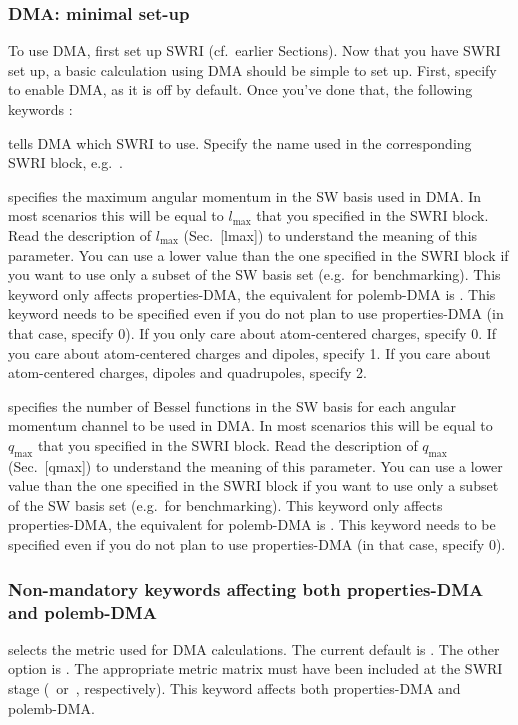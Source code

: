 \documentclass[letterpaper,10pt,english]{sphinxmanual}
\begin{document}
\subsubsection{DMA: minimal set-up}
\label{\detokenize{hfx:dma-minimal-set-up}}
To use DMA, first set up SWRI (cf. earlier Sections). Now that you have
SWRI set up, a basic calculation using DMA should be simple to set up.
First, specify  to enable DMA, as it is off by
default. Once you’ve done that, the following keywords :

 \textendash{} tells DMA which SWRI to use. Specify the name
used in the corresponding SWRI block, e.g. .

 \textendash{} specifies the maximum angular momentum in the
SW basis used in DMA. In most scenarios this will be equal to
\(l_{\textrm{max}}\) that you specified in the SWRI block. Read the
description of \(l_{\textrm{max}}\) (Sec. {[}lmax{]}) to understand the
meaning of this parameter. You can use a lower value than the one
specified in the SWRI block if you want to use only a subset of the SW
basis set (e.g. for benchmarking). This keyword only affects
properties-DMA, the equivalent for polemb-DMA is .
This keyword needs to be specified even if you do not plan to use
properties-DMA (in that case, specify 0). If you only care about
atom-centered charges, specify 0. If you care about atom-centered
charges and dipoles, specify 1. If you care about atom-centered charges,
dipoles and quadrupoles, specify 2.

 \textendash{} specifies the number of Bessel functions in
the SW basis for each angular momentum channel to be used in DMA. In
most scenarios this will be equal to \(q_{\textrm{max}}\) that you
specified in the SWRI block. Read the description of
\(q_{\textrm{max}}\) (Sec. {[}qmax{]}) to understand the meaning of this
parameter. You can use a lower value than the one specified in the SWRI
block if you want to use only a subset of the SW basis set (e.g. for
benchmarking). This keyword only affects properties-DMA, the equivalent
for polemb-DMA is . This keyword needs to be
specified even if you do not plan to use properties-DMA (in that case,
specify 0).


\subsubsection{Non-mandatory keywords affecting both properties-DMA and polemb-DMA}
\label{\detokenize{hfx:non-mandatory-keywords-affecting-both-properties-dma-and-polemb-dma}}
 \textendash{} selects the metric used for DMA calculations.
The current default is . The other option is
. The appropriate metric matrix must have been included at
the SWRI stage ( or , respectively). This keyword affects both
properties-DMA and polemb-DMA.
\end{document}
